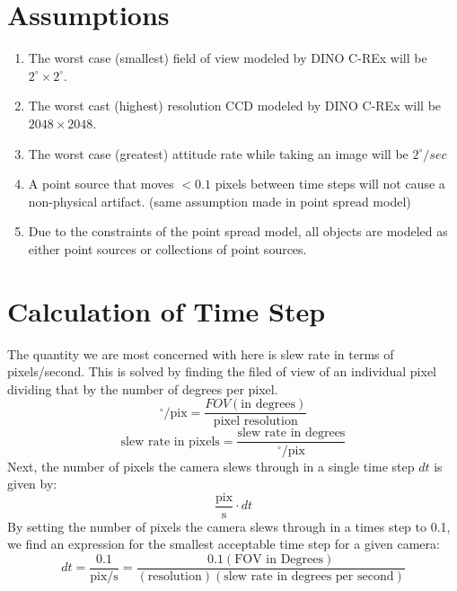 \documentclass[]{DINOReportMemo}
\begin{document}
\section{Assumptions}
\begin{enumerate}
    \item The worst case (smallest) field of view modeled by DINO C-REx will be $2^\circ\times 2^\circ$.
    \item The worst cast (highest) resolution CCD modeled by DINO C-REx will be $2048\times2048$.
    \item The worst case (greatest) attitude rate while taking an image will be $2^\circ/sec$
    \item A point source that moves $<0.1$ pixels between time steps will not cause a non-physical artifact. (same assumption made in point spread model)
    \item Due to the constraints of the point spread model, all objects are modeled as either point sources or collections of point sources.
\end{enumerate}

\section{Calculation of Time Step}
The quantity we are most concerned with here is slew rate in terms of pixels/second. This is solved by finding the filed of view of an individual pixel dividing that by the number of degrees per pixel.
\begin{equation}
   {}^\circ/\text{pix} =  \frac{FOV (\text{in degrees})}{\text{pixel resolution}}
\end{equation}
\begin{equation}
   \text{slew rate in pixels} = \frac{\text{slew rate in degrees}}{{}^\circ/\text{pix}}
\end{equation}
Next, the number of pixels the camera slews through in a single time step $dt$ is given by:
\begin{equation}
    \frac{\text{pix}}{\text{s}}\cdot dt
\end{equation}
By setting the number of pixels the camera slews through in a times step to 0.1, we find an expression for the smallest acceptable time step for a given camera:
\begin{equation}
    dt = \frac{0.1}{\text{pix/s}} = \frac{0.1(\text{FOV in Degrees})}{(\text{resolution})(\text{slew rate in degrees per second})}
\end{equation}
\end{document}
